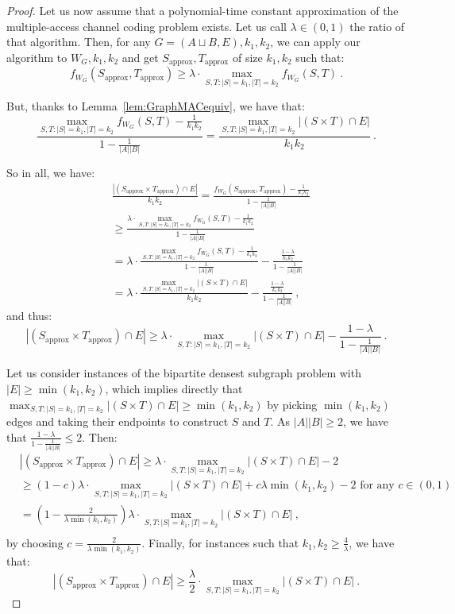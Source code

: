 \begin{proof}
Let us now assume that a polynomial-time constant approximation of the multiple-access channel coding problem exists. Let us call $\lambda \in (0,1)$ the ratio of that algorithm. Then, for any $G=(A \sqcup B,E),k_1,k_2$, we can apply our algorithm to $W_G,k_1,k_2$ and get $S_{\text{approx}},T_{\text{approx}}$ of size $k_1,k_2$ such that:
\[ f_{W_G}(S_{\text{approx}},T_{\text{approx}}) \geq \lambda \cdot \max_{S,T:|S|=k_1,|T|=k_2}f_{W_G}(S,T) \ .\]

But, thanks to Lemma~\ref{lem:GraphMACequiv}, we have that:
  \[ \frac{\max_{S,T:|S|=k_1,|T|=k_2}f_{W_G}(S,T) - \frac{1}{k_1k_2}}{1-\frac{1}{|A||B|}}  = \frac{\max_{S,T:|S|=k_1,|T|=k_2}|(S \times T) \cap E|}{k_1k_2} \ .\]

So in all, we have:
\begin{equation}
  \begin{aligned}
    &\frac{|(S_{\text{approx}} \times T_{\text{approx}}) \cap E|}{k_1k_2} = \frac{f_{W_G}(S_{\text{approx}},T_{\text{approx}}) - \frac{1}{k_1k_2}}{1-\frac{1}{|A||B|}}\\
    &\geq \frac{\lambda \cdot \max_{S,T:|S|=k_1,|T|=k_2}f_{W_G}(S,T) - \frac{1}{k_1k_2}}{1-\frac{1}{|A||B|}}\\
    &= \lambda \cdot \frac{\max_{S,T:|S|=k_1,|T|=k_2}f_{W_G}(S,T) - \frac{1}{k_1k_2}}{1-\frac{1}{|A||B|}} - \frac{\frac{1-\lambda}{k_1k_2}}{1-\frac{1}{|A||B|}}\\
    &= \lambda \cdot \frac{\max_{S,T:|S|=k_1,|T|=k_2}|(S \times T) \cap E|}{k_1k_2} - \frac{\frac{1-\lambda}{k_1k_2}}{1-\frac{1}{|A||B|}} \ ,
  \end{aligned}
\end{equation}
and thus:
\[ |(S_{\text{approx}} \times T_{\text{approx}}) \cap E| \geq \lambda \cdot \max_{S,T:|S|=k_1,|T|=k_2}|(S \times T) \cap E| - \frac{1-\lambda}{1-\frac{1}{|A||B|}} \ .\]

Let us consider instances of the bipartite densest subgraph problem with $|E| \geq \min(k_1,k_2)$, which implies directly that $\max_{S,T:|S|=k_1,|T|=k_2}|(S \times T) \cap E| \geq \min(k_1,k_2)$ by picking $\min(k_1,k_2)$ edges and taking their endpoints to construct $S$ and $T$. As $|A||B| \geq 2$, we have that $\frac{1-\lambda}{1-\frac{1}{|A||B|}} \leq 2$. Then:
\begin{equation}
  \begin{aligned}
     &|(S_{\text{approx}} \times T_{\text{approx}}) \cap E| \geq \lambda \cdot \max_{S,T:|S|=k_1,|T|=k_2}|(S \times T) \cap E| - 2\\
     &\geq (1-c)\lambda \cdot \max_{S,T:|S|=k_1,|T|=k_2}|(S \times T) \cap E| + c\lambda\min(k_1,k_2) - 2 \text{ for any } c \in (0,1)\\
     &=\left(1 - \frac{2}{\lambda\min(k_1,k_2)} \right) \lambda \cdot \max_{S,T:|S|=k_1,|T|=k_2}|(S \times T) \cap E| \ ,\\
  \end{aligned}
\end{equation}
by choosing $c=\frac{2}{\lambda\min(k_1,k_2)}$. Finally, for instances such that $k_1,k_2 \geq \frac{4}{\lambda}$, we have that:
\[|(S_{\text{approx}} \times T_{\text{approx}}) \cap E| \geq \frac{\lambda}{2} \cdot \max_{S,T:|S|=k_1,|T|=k_2}|(S \times T) \cap E| \ .\]


\end{proof}
